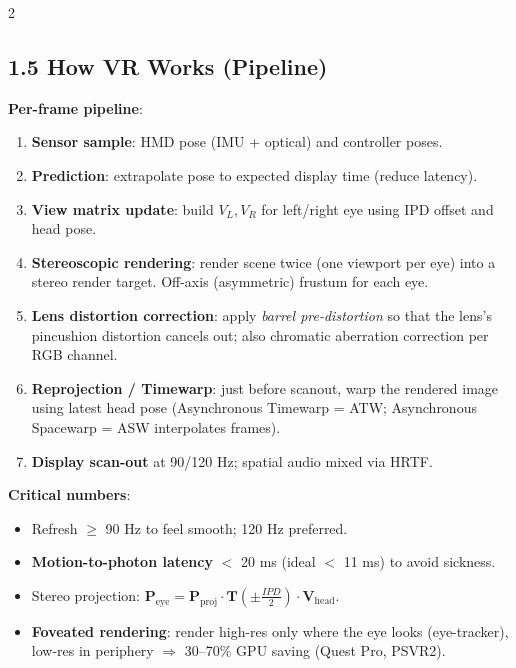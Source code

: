 \begin{paracol}{2}
\subsection*{1.5 How VR Works (Pipeline)}
\textbf{Per-frame pipeline}:
\begin{enumerate}[leftmargin=*,nosep]
  \item \textbf{Sensor sample}: HMD pose (IMU + optical) and controller poses.
  \item \textbf{Prediction}: extrapolate pose to expected display time (reduce latency).
  \item \textbf{View matrix update}: build $V_L, V_R$ for left/right eye using IPD offset and head pose.
  \item \textbf{Stereoscopic rendering}: render scene twice (one viewport per eye) into a stereo render target. Off-axis (asymmetric) frustum for each eye.
  \item \textbf{Lens distortion correction}: apply \emph{barrel pre-distortion} so that the lens's pincushion distortion cancels out; also chromatic aberration correction per RGB channel.
  \item \textbf{Reprojection / Timewarp}: just before scanout, warp the rendered image using latest head pose (Asynchronous Timewarp = ATW; Asynchronous Spacewarp = ASW interpolates frames).
  \item \textbf{Display scan-out} at 90/120 Hz; spatial audio mixed via HRTF.
\end{enumerate}
\textbf{Critical numbers}:
\begin{itemize}[leftmargin=*,nosep]
  \item Refresh $\geq$ 90 Hz to feel smooth; 120 Hz preferred.
  \item \textbf{Motion-to-photon latency} $<$ 20 ms (ideal $<$ 11 ms) to avoid sickness.
  \item Stereo projection: $\mathbf{P}_{\text{eye}} = \mathbf{P}_{\text{proj}} \cdot \mathbf{T}(\pm \tfrac{IPD}{2}) \cdot \mathbf{V}_{\text{head}}$.
  \item \textbf{Foveated rendering}: render high-res only where the eye looks (eye-tracker), low-res in periphery $\Rightarrow$ 30–70\% GPU saving (Quest Pro, PSVR2).
\end{itemize}

\begin{center}\scriptsize
{}
\end{center}


\end{paracol}
